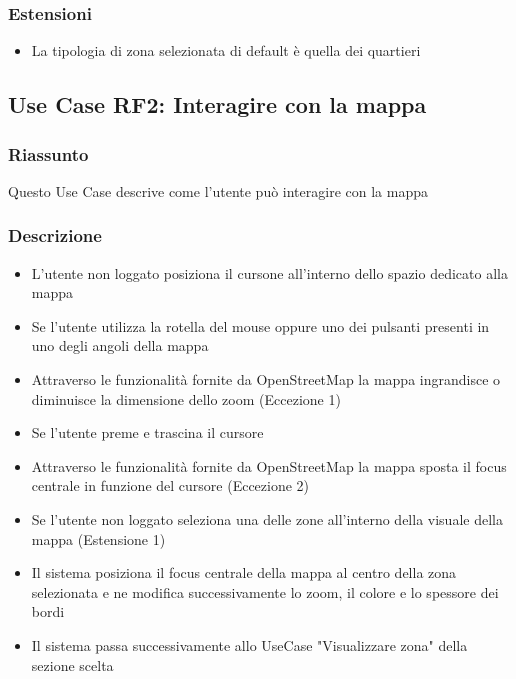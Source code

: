         \subsubsection{Estensioni}
            \begin{itemize}
                \item La tipologia di zona selezionata di default è quella dei quartieri
            \end{itemize}
    
    \subsection{Use Case RF2: Interagire con la mappa}
        \subsubsection{Riassunto}
            Questo Use Case descrive come l'utente può interagire con la mappa
        \subsubsection{Descrizione}
            \begin{itemize}
                \item L'utente non loggato posiziona il cursone all'interno dello spazio dedicato alla mappa
                \item Se l'utente utilizza la rotella del mouse oppure uno dei pulsanti presenti in uno degli angoli della mappa
                \item Attraverso le funzionalità fornite da OpenStreetMap la mappa ingrandisce o diminuisce la dimensione dello zoom (Eccezione 1)
                \item Se l'utente preme e trascina il cursore
                \item Attraverso le funzionalità fornite da OpenStreetMap la mappa sposta il focus centrale in funzione del cursore (Eccezione 2)
                \item Se l'utente non loggato seleziona una delle zone all'interno della visuale della mappa (Estensione 1)
                \item Il sistema posiziona il focus centrale della mappa al centro della zona selezionata e ne modifica successivamente lo zoom, il colore e lo spessore dei bordi
                \item Il sistema passa successivamente allo UseCase "Visualizzare zona" della sezione scelta
            \end{itemize}
